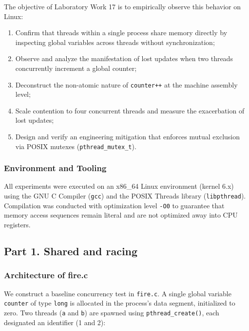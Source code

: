 \documentclass{labreport}
\begin{document}
The objective of Laboratory Work 17 is to empirically observe this behavior on Linux:
\begin{enumerate}[label=(\alph*), noitemsep]
    \item Confirm that threads within a single process share memory directly by inspecting global variables across threads without synchronization;
    \item Observe and analyze the manifestation of lost updates when two threads concurrently increment a global counter;
    \item Deconstruct the non-atomic nature of \texttt{counter++} at the machine assembly level;
    \item Scale contention to four concurrent threads and measure the exacerbation of lost updates;
    \item Design and verify an engineering mitigation that enforces mutual exclusion via POSIX mutexes (\texttt{pthread\_mutex\_t}).
\end{enumerate}

\subsubsection*{Environment and Tooling}
All experiments were executed on an x86\_64 Linux environment (kernel 6.x) using the GNU C Compiler (\texttt{gcc}) and the POSIX Threads library (\texttt{libpthread}). Compilation was conducted with optimization level \texttt{-O0} to guarantee that memory access sequences remain literal and are not optimized away into CPU registers.

\subsection{Part 1. Shared and racing}

\subsubsection{Architecture of fire.c}
We construct a baseline concurrency test in \texttt{fire.c}. A single global variable \texttt{counter} of type \texttt{long} is allocated in the process's data segment, initialized to zero. Two threads (\texttt{a} and \texttt{b}) are spawned using \texttt{pthread\_create()}, each designated an identifier (1 and 2):
\end{document}
